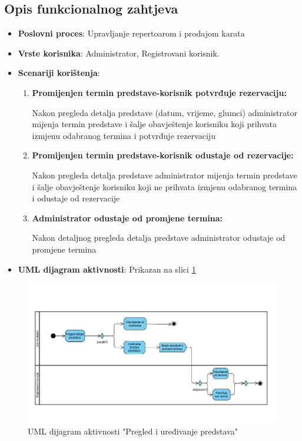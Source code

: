 \subsection{Opis funkcionalnog zahtjeva}  
\begin{itemize}  
    \item \textbf{Poslovni proces}: Upravljanje repertoarom i prodajom karata
    \item \textbf{Vrste korisnika}: Administrator, Registrovani korisnik.  
    \item \textbf{Scenariji korištenja}:  
        \begin{enumerate}  
            \item \textbf{Promijenjen termin predstave-korisnik potvrđuje rezervaciju:} 

            
            Nakon pregleda detalja predstave (datum, vrijeme, glumci) administrator mijenja termin predstave i šalje obavještenje korisniku koji prihvata izmjenu odabranog termina i potvrđuje rezervaciju  
            
            \item \textbf{Promijenjen termin predstave-korisnik odustaje od rezervacije:} 

            
            Nakon pregleda detalja predstave administrator mijenja termin predstave i šalje obavještenje korisniku koji ne prihvata izmjenu odabranog termina i odustaje od rezervacije
  
            \item \textbf{Administrator odustaje od promjene termina:} 

            
            Nakon detaljnog pregleda detalja predstave administrator odustaje od promjene termina  
        \end{enumerate}
    \item \textbf{UML dijagram aktivnosti}: Prikazan na slici \ref{fig:fz1} 
\end{itemize}   
\begin{figure}[H]
    \centering
    \includegraphics[width=1\textwidth]{Slike/Fz1.png}
    \caption{UML dijagram aktivnosti "Pregled i uređivanje predstava"}
    \label{fig:fz1}
\end{figure}

